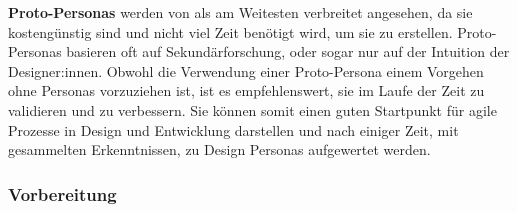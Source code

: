 \textbf{Proto-Personas} werden von \textcite{tomlinUXOptimization2018} als am Weitesten verbreitet angesehen, da sie kostengünstig sind und nicht viel Zeit benötigt wird, um sie zu erstellen. Proto-Personas basieren oft auf Sekundärforschung, oder sogar nur auf der Intuition der Designer:innen. Obwohl die Verwendung einer Proto-Persona einem Vorgehen ohne Personas vorzuziehen ist, ist es empfehlenswert, sie im Laufe der Zeit zu validieren und zu verbessern. Sie können somit einen guten Startpunkt für agile Prozesse in Design und Entwicklung darstellen und nach einiger Zeit, mit gesammelten Erkenntnissen, zu Design Personas aufgewertet werden.
\parencite{tomlinUXOptimization2018}


\subsubsection{Vorbereitung}
